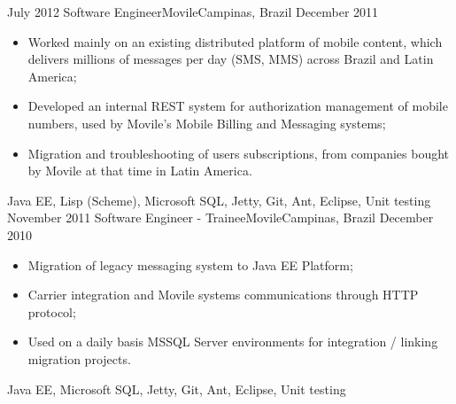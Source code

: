 \begin{experiences}
  \emptySeparator
  \experience
    {July 2012} {Software Engineer}{Movile}{Campinas, Brazil}
    {December 2011}    {
          \begin{itemize}
            \item Worked mainly on an existing distributed platform of mobile content, which delivers millions of
            messages per day (SMS, MMS) across Brazil and Latin America;
            \item Developed an internal REST system for authorization management of mobile numbers,
             used by Movile's Mobile Billing and Messaging systems;
            \item Migration and troubleshooting of users subscriptions, from companies bought by Movile at that time in Latin America.\\
          \end{itemize}
        }{Java EE, Lisp (Scheme), Microsoft SQL, Jetty, Git, Ant, Eclipse, Unit testing}
  \emptySeparator
  \experience
  {November 2011} {Software Engineer - Trainee}{Movile}{Campinas, Brazil}
  {December 2010}
        {
          \begin{itemize}
            \item Migration of legacy messaging system to Java EE Platform;
            \item Carrier integration and Movile systems communications through HTTP protocol;
            \item Used on a daily basis MSSQL Server environments for integration / linking migration projects.\\
          \end{itemize}
        }{Java EE, Microsoft SQL, Jetty, Git, Ant, Eclipse, Unit testing}
\end{experiences}
